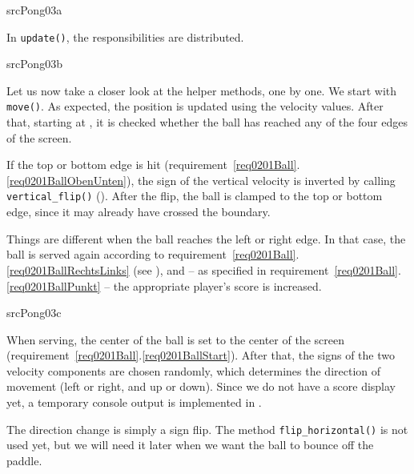\newpage
{}
{srcPong03a}

In \texttt{update()}, the responsibilities are distributed.

{srcPong03b}

Let us now take a closer look at the helper methods, one by one. We start with \texttt{move()}. As expected, the position is updated using the velocity values. After that, starting at , it is checked whether the ball has reached any of the four edges of the screen.

If the top or bottom edge is hit (requirement~\ref{req0201Ball}.\ref{req0201BallObenUnten}), the sign of the vertical velocity is inverted by calling \texttt{vertical\_flip()} (). After the flip, the ball is clamped to the top or bottom edge, since it may already have crossed the boundary.

Things are different when the ball reaches the left or right edge. In that case, the ball is served again according to requirement~\ref{req0201Ball}.\ref{req0201BallRechtsLinks} (see ), and -- as specified in requirement~\ref{req0201Ball}.\ref{req0201BallPunkt} -- the appropriate player’s score is increased.

{srcPong03c}

When serving, the center of the ball is set to the center of the screen (requirement~\ref{req0201Ball}.\ref{req0201BallStart}). After that, the signs of the two velocity components are chosen randomly, which determines the direction of movement (left or right, and up or down). Since we do not have a score display yet, a temporary console output is implemented in .


The direction change is simply a sign flip. The method \texttt{flip\_hori\-zon\-tal()} is not used yet, but we will need it later when we want the ball to bounce off the paddle.



